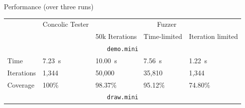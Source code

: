 \documentclass{beamer}
\begin{document}
\begin{frame}{Performance (over three runs)}
  \begin{adjustbox}{minipage=[c]{\pagewidth-.25in},center}
    \fontsize{10pt}{12pt}\selectfont
    \begin{tabular}{l|l|lll}
      & Concolic Tester & \multicolumn{3}{c}{Fuzzer}\\
                                                      &                 & 50k Iterations               & Time-limited & Iteration limited\\
      \midrule
      \multicolumn{5}{c}{\texttt{demo.mini}}        \\
      Time                                              & \SI{7.23}{s}    & \SI{10.00}{s}                & \SI{7.56}{s} & \SI{1.22}{s}\\
                               Iterations             & 1,344           & 50,000                       & 35,810       & 1,344\\
                               Coverage               & 100\%           & 98.37\%                      & 95.12\%      & 74.80\%\\
      \midrule
      \multicolumn{5}{c}{\texttt{draw.mini}}         \\

\end{tabular}
\end{adjustbox}
\end{frame}
\end{document}
